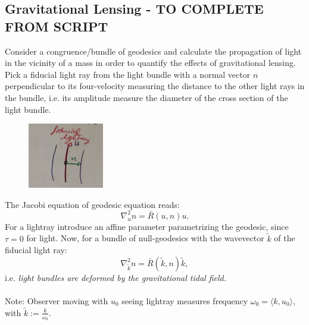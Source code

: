 \subsection{Gravitational Lensing - TO COMPLETE FROM SCRIPT}
Consider a congruence/bundle of geodesics and calculate the propagation of light in the vicinity of a mass in order to quantify the effects of gravitational lensing. Pick a fiducial light ray from the light bundle with a normal vector $n$ perpendicular to its four-velocity measuring the distance to the other light rays in the bundle, i.e. its amplitude measure the diameter of the cross section of the light bundle.\\

\begin{figure}
	\centering
	\includegraphics[width=0.7\linewidth]{gfx/gravlensingLightcongruence}
	\caption{}
	\label{fig:gravlensinglightcongruence}
\end{figure}
The Jacobi equation of geodesic equation reads:
\begin{equation}
\nabla^2_u n = \bar{R}(u,n)u.
\end{equation}
For a lightray introduce an affine parameter parametrizing the geodesic, since $\tau=0$ for light. Now, for a bundle of null-geodesics with the wavevector $\tilde{k}$ of the fiducial light ray:
\begin{equation}
\nabla^2_{\tilde{k}} n = \bar{R}(\tilde{k},n)\tilde{k},
\end{equation}
i.e. \emph{light bundles are deformed by the gravitational tidal field.}\\
\\
Note: Observer moving with $u_0$ seeing lightray measures frequency $\omega_0=\langle k, u_0 \rangle$, with $\tilde{k}:= \frac{k}{\omega_0}$.\\
\\
